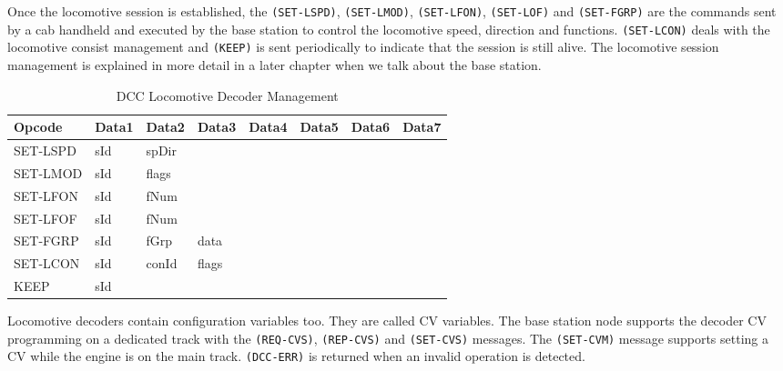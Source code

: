 Once the locomotive session is established, the \texttt{(SET-LSPD)}, \texttt{(SET-LMOD)}, \texttt{(SET-LFON)}, \texttt{(SET-LOF)} and \texttt{(SET-FGRP)} are the commands sent by a cab handheld and executed by the base station to control the locomotive speed, direction and functions. \texttt{(SET-LCON)} deals with the locomotive consist management and \texttt{(KEEP)} is sent periodically to indicate that the session is still alive. The locomotive session management is explained in more detail in a later chapter when we talk about the base station.

\begin{table}[ht!]
    \begin{center}
        \caption{DCC Locomotive Decoder Management}
        \begin{tabular}{|l|l|l|l|l|l|l|l|}
            \toprule
            \textbf{Opcode} & \textbf{Data1} & \textbf{Data2} & \textbf{Data3} & \textbf{Data4} & \textbf{Data5} & \textbf{Data6} & \textbf{Data7} \\
            \midrule
            SET-LSPD & sId & spDir & & & & & \\
            SET-LMOD & sId & flags & & & & & \\
            SET-LFON & sId & fNum  & & & & & \\
            SET-LFOF & sId & fNum  & & & & & \\
            SET-FGRP & sId & fGrp  & data & & & & \\
            SET-LCON & sId & conId & flags & & & & \\
            KEEP & sId & & & & & & \\
            \bottomrule
        \end{tabular}
    \end{center}
\end{table}

Locomotive decoders contain configuration variables too. They are called CV variables. The base station node supports the decoder CV programming on a dedicated track with the \texttt{(REQ-CVS)}, \texttt{(REP-CVS)} and \texttt{(SET-CVS)} messages. The \texttt{(SET-CVM)} message supports setting a CV while the engine is on the main track. \texttt{(DCC-ERR)} is returned when an invalid operation is detected.

